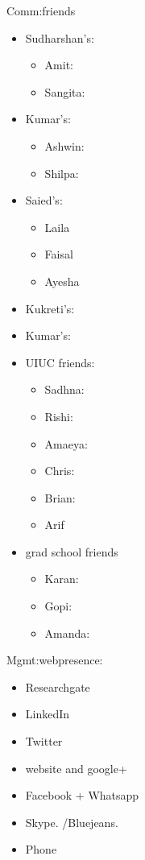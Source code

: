 \documentclass[serif, mathserif, final]{beamer}
\begin{document}
\begin{frame}
\begin{columns}
\begin{column}{0.25\linewidth}
\begin{block}{Comm:friends}
\begin{itemize}
\item Sudharshan’s: 
\begin{itemize} 
\tiny \item \tiny Amit:  
\item \tiny Sangita:  
\end{itemize} 

\item Kumar’s:
\begin{itemize}
\tiny \item \tiny Ashwin: 
\item \tiny Shilpa: 
\end{itemize} 

\item Saied’s: 
\begin{itemize}
\tiny \item \tiny Laila 
\item \tiny Faisal 
\item \tiny Ayesha
\end{itemize} 

\item Kukreti’s:

\item Kumar’s:
\item UIUC friends: 
\begin{itemize} 
\tiny \item \tiny Sadhna: 
\item \tiny Rishi: 
\item \tiny Amaeya: 
\item \tiny Chris: 
\item \tiny Brian: 
\item \tiny Arif 
\end{itemize} 
\item grad school friends 
\begin{itemize} 
\tiny \item \tiny  Karan: 
\item \tiny Gopi: 
\item \tiny Amanda:  
\end{itemize}

\end{itemize} 
\end{block} 

\begin{block}{Mgmt:webpresence:}
\begin{itemize} 
\tiny \item \tiny Researchgate 
\item \tiny LinkedIn 
\item \tiny Twitter 
\item \tiny website and google+ 
\item \tiny Facebook + Whatsapp
\item \tiny Skype. /Bluejeans. 
\item \tiny Phone
\end{itemize}
\end{block} 



\end{column}
\end{columns}
\end{frame}
\end{document}
